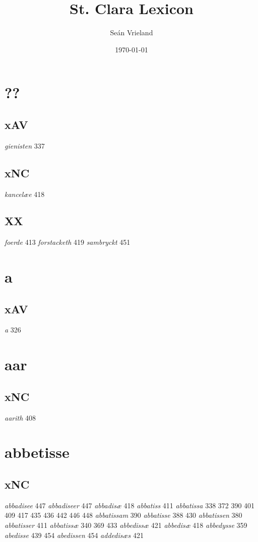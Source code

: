 \documentclass[a4paper,twocolumn]{article}
\author{Seán Vrieland}
\date{\today}
\title{St. Clara Lexicon}
\renewcommand\maketitle{}
\begin{document}
\maketitle
\section{??}
\label{sec:org265cec5}
\subsection{xAV}
\label{sec:org769bfed}
\emph{gienisten} 337 
\subsection{xNC}
\label{sec:org2f933b3}
\emph{kancelæe} 418 
\subsection{XX}
\label{sec:orgbf25090}
\emph{foerde} 413 \emph{forstacketh} 419 \emph{sambryckt} 451 
\section{a}
\label{sec:orgb384e26}
\subsection{xAV}
\label{sec:org3cfa5a5}
\emph{a} 326 
\section{aar}
\label{sec:org5821717}
\subsection{xNC}
\label{sec:orgb926253}
\emph{aarith} 408 
\section{abbetisse}
\label{sec:org1702b95}
\subsection{xNC}
\label{sec:org2ac8746}
\emph{abbadisee} 447 \emph{abbadiseer} 447 \emph{abbadisæ} 418 \emph{abbatiss} 411 \emph{abbatissa} 338 372 390 401 409 417 435 436 442 446 448 \emph{abbatissam} 390 \emph{abbatisse} 388 430 \emph{abbatissen} 380 \emph{abbatisser} 411 \emph{abbatissæ} 340 369 433 \emph{abbedissæ} 421 \emph{abbedisæ} 418 \emph{abbedysse} 359 \emph{abedisse} 439 454 \emph{abedissen} 454 \emph{addedisæs} 421 
\end{document}
